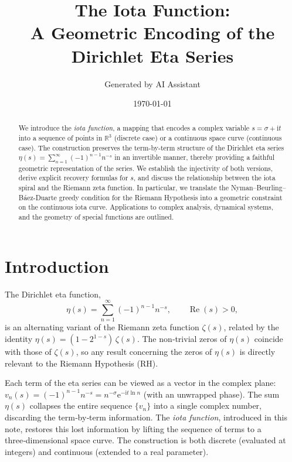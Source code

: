 \documentclass[11pt]{article}
\title{The Iota Function:\\ A Geometric Encoding of the Dirichlet Eta Series}
\author{Generated by AI Assistant}
\date{\today}
\newcommand{\R}{\mathbb{R}}
\newcommand{\iu}{\mathrm{i}} %
\newcommand{\e}{\mathrm{e}}
\DeclareMathOperator{\ReOp}{Re}
\begin{document}
\maketitle

\begin{abstract}
We introduce the \emph{iota function}, a mapping that encodes a complex variable $s = \sigma + \iu t$ into a sequence of points in $\R^3$ (discrete case) or a continuous space curve (continuous case). The construction preserves the term-by-term structure of the Dirichlet eta series $\eta(s) = \sum_{n=1}^\infty (-1)^{n-1} n^{-s}$ in an invertible manner, thereby providing a faithful geometric representation of the series. We establish the injectivity of both versions, derive explicit recovery formulas for $s$, and discuss the relationship between the iota spiral and the Riemann zeta function. In particular, we translate the Nyman--Beurling--B\'aez-Duarte greedy condition for the Riemann Hypothesis into a geometric constraint on the continuous iota curve. Applications to complex analysis, dynamical systems, and the geometry of special functions are outlined.
\end{abstract}

\tableofcontents

\section{Introduction}

The Dirichlet eta function,
\begin{equation}
  \eta(s) = \sum_{n=1}^{\infty} (-1)^{n-1} n^{-s}, \qquad \ReOp(s) > 0,
\end{equation}
is an alternating variant of the Riemann zeta function $\zeta(s)$, related by the identity
$\eta(s) = (1 - 2^{1-s})\,\zeta(s)$.  The non‑trivial zeros of $\eta(s)$ coincide with those of $\zeta(s)$, so any result concerning the zeros of $\eta(s)$ is directly relevant to the Riemann Hypothesis (RH).

Each term of the eta series can be viewed as a vector in the complex plane:
$v_n(s) = (-1)^{n-1} n^{-s} = n^{-\sigma} \e^{-\iu t \ln n}$ (with an unwrapped phase).  The sum $\eta(s)$ collapses the entire sequence $\{v_n\}$ into a single complex number, discarding the term‑by‑term information.  The \emph{iota function}, introduced in this note, restores this lost information by lifting the sequence of terms to a three‑dimensional space curve.  The construction is both discrete (evaluated at integers) and continuous (extended to a real parameter).
\end{document}
